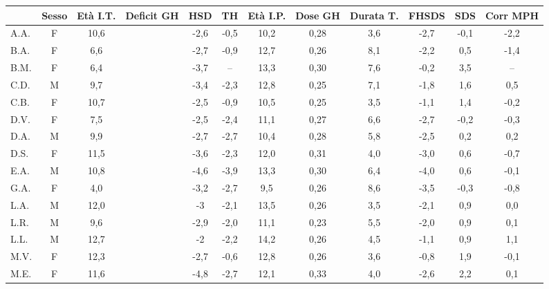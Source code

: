 \begin{sidewaystable}
\centering
\begin{tabular}{lccccccccccc}
\toprule
 	& Sesso & Età I.T. & Deficit GH & HSD %
 	& TH %
 	& Età I.P.
 	& Dose GH
 	& Durata T.
 	& FHSDS
 	& \Delta SDS
 	& Corr MPH
 	\\
\midrule                                
A.A. & F & 10,6 &  		& -2,6 & -0,5 & 10,2 & 0,28 & 3,6 & -2,7 & -0,1 & -2,2                    \\
B.A. & F & 6,6  & \checkmark 	& -2,7 & -0,9 & 12,7 & 0,26 & 8,1 & -2,2 & 0,5  & -1,4                    \\
B.M. & F & 6,4  & \checkmark 	& -3,7 & --   & 13,3 & 0,30 & 7,6 & -0,2 & 3,5  & --                      \\
C.D. & M & 9,7  &  	            & -3,4 & -2,3 & 12,8 & 0,25 & 7,1 & -1,8 & 1,6  & 0,5                     \\
C.B. & F & 10,7 &  		& -2,5 & -0,9 & 10,5 & 0,25 & 3,5 & -1,1 & 1,4  & -0,2                           \\
D.V.& F & 7,5  & \checkmark 	& -2,5 & -2,4 & 11,1 & 0,27 & 6,6 & -2,7 & -0,2 & -0,3                    \\
D.A. & M & 9,9  &  		& -2,7 & -2,7 & 10,4 & 0,28 & 5,8 & -2,5 & 0,2     & 0,2                               \\
D.S.& F & 11,5 & \checkmark 	& -3,6 & -2,3 & 12,0 & 0,31 & 4,0 & -3,0 & 0,6  & -0,7                    \\
E.A. & M & 10,8 &  		& -4,6 & -3,9 & 13,3 & 0,30 & 6,4 & -4,0 & 0,6  & -0,1                           \\
G.A. & F & 4,0  &  		& -3,2 & -2,7 & 9,5  & 0,26 & 8,6 & -3,5 & -0,3 & -0,8                               \\
L.A. & M & 12,0 & \checkmark 	&  -3  & -2,1 & 13,5 & 0,26 & 3,5 & -2,1 & 0,9  & 0,0                     \\
L.R. & M & 9,6  &  		& -2,9 & -2,0 & 11,1 & 0,23 & 5,5 & -2,0 & 0,9  & 0,1                            \\
L.L. & M & 12,7 &  		&  -2  & -2,2 & 14,2 & 0,26 & 4,5 & -1,1 & 0,9  & 1,1                            \\
M.V. & F & 12,3 & \checkmark 	& -2,7 & -0,6 & 12,8 & 0,26 & 3,6 & -0,8 & 1,9  & -0,1                    \\
M.E. & F & 11,6 &  		& -4,8 & -2,7 & 12,1 & 0,33 & 4,0 & -2,6 & 2,2  & 0,1                            \\

\end{tabular}
\end{sidewaystable}
